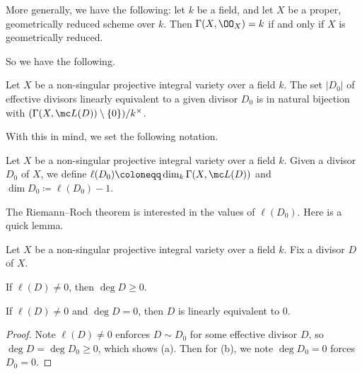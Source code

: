\documentclass[../notes.tex]{subfiles}
\begin{document}
\begin{remark}
	More generally, we have the following: let $k$ be a field, and let $X$ be a proper, geometrically reduced scheme over $k$. Then $\Gamma(X,\OO_X)=k$ if and only if $X$ is geometrically reduced.
\end{remark}
So we have the following.
\begin{corollary}
	Let $X$ be a non-singular projective integral variety over a field $k$. The set $|D_0|$ of effective divisors linearly equivalent to a given divisor $D_0$ is in natural bijection with $(\Gamma(X,\mc L(D))\setminus\{0\})/k^\times$.
\end{corollary}
With this in mind, we set the following notation.
\begin{notation}
	Let $X$ be a non-singular projective integral variety over a field $k$. Given a divisor $D_0$ of $X$, we define $\ell(D_0)\coloneqq\dim_k\Gamma(X,\mc L(D))$ and $\dim D_0\coloneqq\ell(D_0)-1$.
\end{notation}
The Riemann--Roch theorem is interested in the values of $\ell(D_0)$. Here is a quick lemma.
\begin{lemma}
	Let $X$ be a non-singular projective integral variety over a field $k$. Fix a divisor $D$ of $X$.
	\begin{listalph}
		\item If $\ell(D)\ne0$, then $\deg D\ge0$.
		\item If $\ell(D)\ne0$ and $\deg D=0$, then $D$ is linearly equivalent to $0$.
	\end{listalph}
\end{lemma}
\begin{proof}
	Note $\ell(D)\ne0$ enforces $D\sim D_0$ for some effective divisor $D$, so $\deg D=\deg D_0\ge0$, which shows (a). Then for (b), we note $\deg D_0=0$ forces $D_0=0$.
\end{proof}
\end{document}
